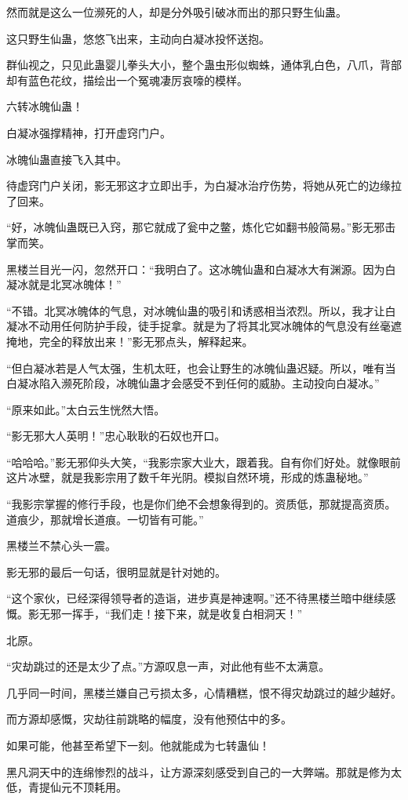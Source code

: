 \begin{this_body}
然而就是这么一位濒死的人，却是分外吸引破冰而出的那只野生仙蛊。

这只野生仙蛊，悠悠飞出来，主动向白凝冰投怀送抱。

群仙视之，只见此蛊婴儿拳头大小，整个蛊虫形似蜘蛛，通体乳白色，八爪，背部却有蓝色花纹，描绘出一个冤魂凄厉哀嚎的模样。

六转冰魄仙蛊！

白凝冰强撑精神，打开虚窍门户。

冰魄仙蛊直接飞入其中。

待虚窍门户关闭，影无邪这才立即出手，为白凝冰治疗伤势，将她从死亡的边缘拉了回来。

“好，冰魄仙蛊既已入窍，那它就成了瓮中之鳖，炼化它如翻书般简易。”影无邪击掌而笑。

黑楼兰目光一闪，忽然开口：“我明白了。这冰魄仙蛊和白凝冰大有渊源。因为白凝冰就是北冥冰魄体！”

“不错。北冥冰魄体的气息，对冰魄仙蛊的吸引和诱惑相当浓烈。所以，我才让白凝冰不动用任何防护手段，徒手捉拿。就是为了将其北冥冰魄体的气息没有丝毫遮掩地，完全的释放出来！”影无邪点头，解释起来。

“但白凝冰若是人气太强，生机太旺，也会让野生的冰魄仙蛊迟疑。所以，唯有当白凝冰陷入濒死阶段，冰魄仙蛊才会感受不到任何的威胁。主动投向白凝冰。”

“原来如此。”太白云生恍然大悟。

“影无邪大人英明！”忠心耿耿的石奴也开口。

“哈哈哈。”影无邪仰头大笑，“我影宗家大业大，跟着我。自有你们好处。就像眼前这片冰壁，就是我影宗用了数千年光阴。模拟自然环境，形成的炼蛊秘地。”

“我影宗掌握的修行手段，也是你们绝不会想象得到的。资质低，那就提高资质。道痕少，那就增长道痕。一切皆有可能。”

黑楼兰不禁心头一震。

影无邪的最后一句话，很明显就是针对她的。

“这个家伙，已经深得领导者的造诣，进步真是神速啊。”还不待黑楼兰暗中继续感慨。影无邪一挥手，“我们走！接下来，就是收复白相洞天！”

北原。

“灾劫跳过的还是太少了点。”方源叹息一声，对此他有些不太满意。

几乎同一时间，黑楼兰嫌自己亏损太多，心情糟糕，恨不得灾劫跳过的越少越好。

而方源却感慨，灾劫往前跳略的幅度，没有他预估中的多。

如果可能，他甚至希望下一刻。他就能成为七转蛊仙！

黑凡洞天中的连绵惨烈的战斗，让方源深刻感受到自己的一大弊端。那就是修为太低，青提仙元不顶耗用。


\end{this_body}
